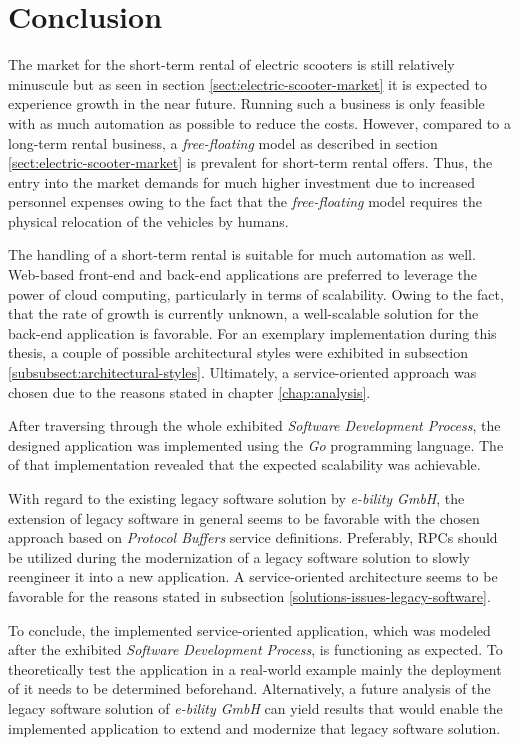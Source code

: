 \documentclass[12pt,a4paper,twoside]{report}
\begin{document}
\chapter{Conclusion} \label{chap:conclusion}

The market for the short-term rental of electric scooters is still relatively
minuscule but as seen in section \ref{sect:electric-scooter-market} it is
expected to experience growth in the near future.
Running such a business is only feasible with as much automation as possible
to reduce the costs. However, compared to a long-term rental business,
a \textit{free-floating} model as described in section \ref{sect:electric-scooter-market}
is prevalent for short-term rental offers. Thus, the entry into the market
demands for much higher investment due to increased personnel expenses
owing to the fact that the \textit{free-floating} model requires
the physical relocation of the vehicles by humans.

The handling of a short-term rental is suitable for much automation as well.
Web-based front-end and back-end applications are preferred to leverage
the power of cloud computing, particularly in terms of scalability.
Owing to the fact, that the rate of growth is currently unknown, a well-scalable
solution for the back-end application is favorable.
For an exemplary implementation during this thesis, a couple of possible
architectural styles were exhibited in subsection \ref{subsubsect:architectural-styles}.
Ultimately, a service-oriented approach was chosen due to the reasons stated
in chapter \ref{chap:analysis}.

After traversing through the whole exhibited \textit{Software Development Process},
the designed application was implemented using the \textit{Go} programming language.
The \textit{} of that implementation revealed that
the expected scalability was achievable.

With regard to the existing legacy software solution by \textit{e-bility GmbH},
the extension of legacy software in general seems to be favorable with
the chosen approach based on \textit{Protocol Buffers} service definitions.
Preferably, RPCs should be utilized during the modernization of a
legacy software solution to slowly reengineer it into a new application.
A service-oriented architecture seems to be favorable for the reasons stated
in subsection \ref{solutions-issues-legacy-software}.

To conclude, the implemented service-oriented application, which was modeled
after the exhibited \textit{Software Development Process}, is functioning as expected.
To theoretically test the application in a real-world example mainly the
deployment of it needs to be determined beforehand.
Alternatively, a future analysis of the legacy software solution of \textit{e-bility GmbH}
can yield results that would enable the implemented application to extend
and modernize that legacy software solution.
\end{document}
